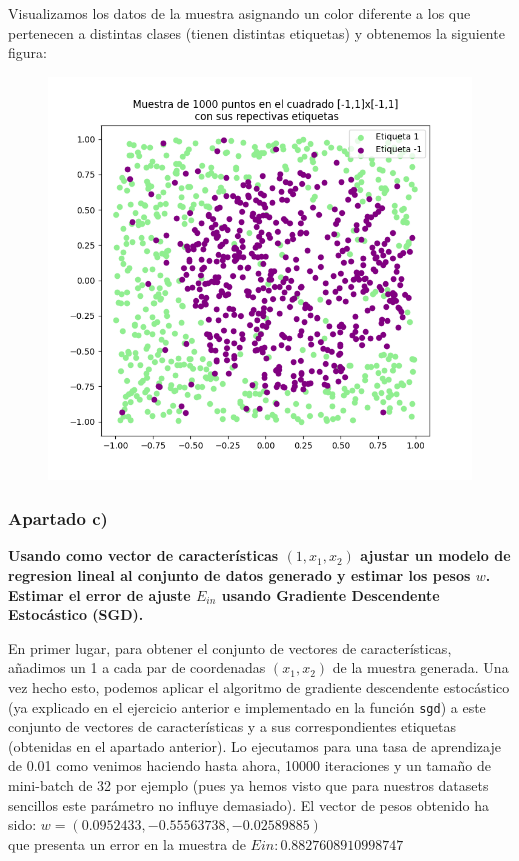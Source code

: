 \documentclass[a4]{article}
\begin{document}
Visualizamos los datos de la muestra asignando un color diferente a los que pertenecen a distintas clases (tienen distintas etiquetas) y obtenemos la siguiente figura:

\begin{figure}[H]
	\centering
	\includegraphics[width=0.8\linewidth]{img/Figure_8}
	\caption{}
	\label{fig:figure8}
\end{figure}

\subsubsection{Apartado c)}
\textbf{Usando como vector de características $(1, x_1 , x_2 )$ ajustar un modelo de regresion
lineal al conjunto de datos generado y estimar los pesos $ w $. Estimar el error de
ajuste $ E_{in} $ usando Gradiente Descendente Estocástico (SGD).}

En primer lugar, para obtener el conjunto de vectores de características, añadimos un 1 a cada par de coordenadas $(x_1,x_2)$ de la muestra generada. Una vez hecho esto, podemos aplicar el algoritmo de gradiente descendente estocástico (ya explicado en el ejercicio anterior e implementado en la función \lstinline|sgd|) a este conjunto de vectores de características y a sus correspondientes etiquetas (obtenidas en el apartado anterior). Lo ejecutamos para una tasa de aprendizaje de 0.01 como venimos haciendo hasta ahora, 10000 iteraciones y un tamaño de mini-batch de 32 por ejemplo (pues ya hemos visto que para nuestros datasets sencillos este parámetro no influye demasiado).  El vector de pesos obtenido ha sido: $w=( 0.0952433,  -0.55563738, -0.02589885) $ \\
que presenta un error en la muestra de $Ein:  0.8827608910998747$
\end{document}
